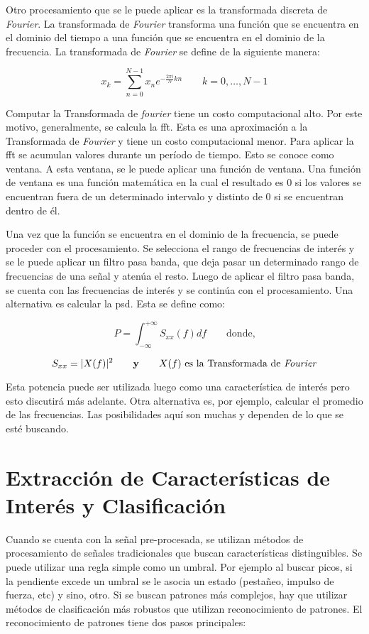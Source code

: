 Otro procesamiento que se le puede aplicar es la transformada discreta de \emph{Fourier}. La transformada de \emph{Fourier} transforma una función que se encuentra en el dominio del tiempo a una función que se encuentra en el dominio de la frecuencia. La transformada de \emph{Fourier} se define de la siguiente manera:

$$ x_{k} = \sum_{n=0}^{N-1} x_{n}e^{-\frac{2 \pi i}{N}kn} \qquad k = 0,\hdots, N - 1 $$

Computar la Transformada de \emph{fourier} tiene un costo computacional alto. Por este motivo, generalmente, se calcula la \acrshort{fft}. Esta es una aproximación a la Transformada de \emph{Fourier} y tiene un costo computacional menor. Para aplicar la \acrshort{fft} se acumulan valores durante un período de tiempo. Esto se conoce como ventana. A esta ventana, se le puede aplicar una función de ventana. Una función de ventana es una función matemática en la cual el resultado es $0$ si los valores se encuentran fuera de un determinado intervalo y distinto de $0$ si se encuentran dentro de él. 

Una vez que la función se encuentra en el dominio de la frecuencia, se puede proceder con el procesamiento. Se selecciona el rango de frecuencias de interés y se le puede aplicar un filtro pasa banda, que deja pasar un determinado rango de frecuencias de una señal y atenúa el resto. Luego de aplicar el filtro pasa banda, se cuenta con las frecuencias de interés y se continúa con el procesamiento. Una alternativa es calcular la \acrshort{psd}. Esta se define como:

$$ P = \int_{-\infty}^{+\infty} S_{xx} (f) df \qquad  \textrm{donde,}$$

$$ S_{xx} = |X(f)|^{2} \qquad \textbf{y} \qquad X(f) \textrm{ es la Transformada de \emph{Fourier}} $$

Esta potencia puede ser utilizada luego como una característica de interés pero esto discutirá más adelante. Otra alternativa  es, por ejemplo, calcular el promedio de las frecuencias. Las posibilidades aquí son muchas y dependen de lo que se esté buscando.

\section{Extracción de Características de Interés y Clasificación} \label{sec:classification}

Cuando se cuenta con la señal pre-procesada, se utilizan métodos de procesamiento de señales tradicionales que buscan características distinguibles.  Se puede utilizar una regla simple como un umbral. Por ejemplo al buscar picos, si la pendiente excede un umbral se le asocia un estado (pestañeo, impulso de fuerza, etc) y sino, otro. Si se buscan patrones más complejos, hay que utilizar métodos de clasificación más robustos que utilizan reconocimiento de patrones. El reconocimiento de patrones tiene dos pasos principales:

